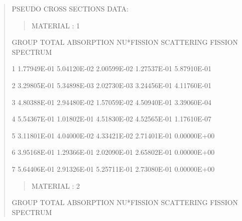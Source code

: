 \documentclass[letterpaper,10pt,english]{sphinxmanual}
\begin{document}
\begin{quote}
PSEUDO  CROSS  SECTIONS  DATA:
\begin{quote}

MATERIAL :   1
\end{quote}

\begin{DUlineblock}{0em}
\item[] GROUP           TOTAL        ABSORPTION      NU*FISSION      SCATTERING      FISSION SPECTRUM       \textbar{}
\end{DUlineblock}

\begin{DUlineblock}{0em}
\item[] 1          1.77949E-01     5.04120E-02     2.00599E-02     1.27537E-01     5.87910E-01           \textbar{}
\item[] 2          3.29805E-01     5.34898E-03     2.02730E-03     3.24456E-01     4.11760E-01           \textbar{}
\item[] 3          4.80388E-01     2.94480E-02     1.57059E-02     4.50940E-01     3.39060E-04           \textbar{}
\item[] 4          5.54367E-01     1.01802E-01     4.51830E-02     4.52565E-01     1.17610E-07           \textbar{}
\item[] 5          3.11801E-01     4.04000E-02     4.33421E-02     2.71401E-01     0.00000E+00           \textbar{}
\item[] 6          3.95168E-01     1.29366E-01     2.02090E-01     2.65802E-01     0.00000E+00           \textbar{}
\item[] 7          5.64406E-01     2.91326E-01     5.25711E-01     2.73080E-01     0.00000E+00           \textbar{}
\end{DUlineblock}
\begin{quote}

MATERIAL :   2
\end{quote}

\begin{DUlineblock}{0em}
\item[] GROUP           TOTAL        ABSORPTION      NU*FISSION      SCATTERING      FISSION SPECTRUM       \textbar{}
\end{DUlineblock}


\end{quote}
\end{document}
